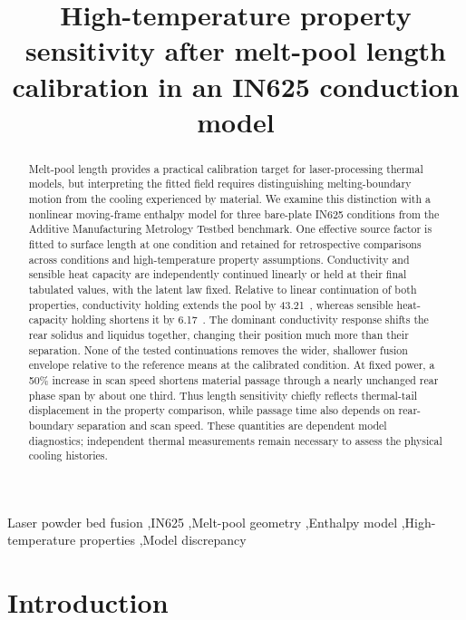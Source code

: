 \begin{frontmatter}
\title{High-temperature property sensitivity after melt-pool length calibration in an IN625 conduction model}
\begin{abstract}
Melt-pool length provides a practical calibration target for laser-processing thermal models, but interpreting the fitted field requires distinguishing melting-boundary motion from the cooling experienced by material.
We examine this distinction with a nonlinear moving-frame enthalpy model for three bare-plate IN625 conditions from the Additive Manufacturing Metrology Testbed benchmark.
One effective source factor is fitted to surface length at one condition and retained for retrospective comparisons across conditions and high-temperature property assumptions.
Conductivity and sensible heat capacity are independently continued linearly or held at their final tabulated values, with the latent law fixed.
Relative to linear continuation of both properties, conductivity holding extends the pool by 43.21~\um{}, whereas sensible heat-capacity holding shortens it by 6.17~\um{}.
The dominant conductivity response shifts the rear solidus and liquidus together, changing their position much more than their separation.
None of the tested continuations removes the wider, shallower fusion envelope relative to the reference means at the calibrated condition.
At fixed power, a 50\% increase in scan speed shortens material passage through a nearly unchanged rear phase span by about one third.
Thus length sensitivity chiefly reflects thermal-tail displacement in the property comparison, while passage time also depends on rear-boundary separation and scan speed.
These quantities are dependent model diagnostics; independent thermal measurements remain necessary to assess the physical cooling histories.
\end{abstract}
\begin{keyword}
Laser powder bed fusion \sep IN625 \sep Melt-pool geometry \sep Enthalpy model \sep High-temperature properties \sep Model discrepancy
\end{keyword}
\end{frontmatter}

\section{Introduction}
\label{sec:introduction}

